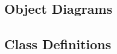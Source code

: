 





\subsection{Object Diagrams}

    \begin{figure}[H]
    \end{figure}

\subsection{Class Definitions}


	\begin{figure}[H]
	\end{figure}

